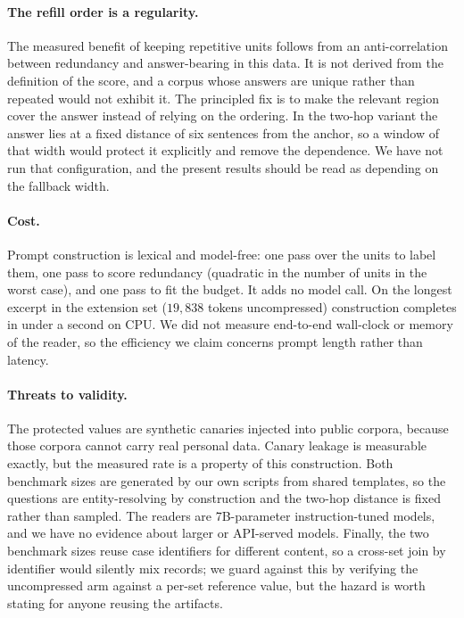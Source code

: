 \paragraph{The refill order is a regularity.}
The measured benefit of keeping repetitive units follows from an anti-correlation between
redundancy and answer-bearing in this data. It is not derived from the definition of the
score, and a corpus whose answers are unique rather than repeated would not exhibit it. The
principled fix is to make the relevant region cover the answer instead of relying on the
ordering. In the two-hop variant the answer lies at a fixed distance of six sentences from
the anchor, so a window of that width would protect it explicitly and remove the dependence.
We have not run that configuration, and the present results should be read as depending on
the fallback width.

\paragraph{Cost.}
Prompt construction is lexical and model-free: one pass over the units to label them, one
pass to score redundancy (quadratic in the number of units in the worst case), and one pass
to fit the budget. It adds no model call. On the longest excerpt in the extension set
($19{,}838$ tokens uncompressed) construction completes in under a second on CPU. We did not
measure end-to-end wall-clock or memory of the reader, so the efficiency we claim concerns
prompt length rather than latency.

\paragraph{Threats to validity.}
The protected values are synthetic canaries injected into public corpora, because those
corpora cannot carry real personal data. Canary leakage is measurable exactly, but the
measured rate is a property of this construction. Both benchmark sizes are generated by our
own scripts from shared templates, so the questions are entity-resolving by construction and
the two-hop distance is fixed rather than sampled. The readers are 7B-parameter
instruction-tuned models, and we have no evidence about larger or API-served models. Finally,
the two benchmark sizes reuse case identifiers for different content, so a cross-set join by
identifier would silently mix records; we guard against this by verifying the uncompressed
arm against a per-set reference value, but the hazard is worth stating for anyone reusing the
artifacts.
